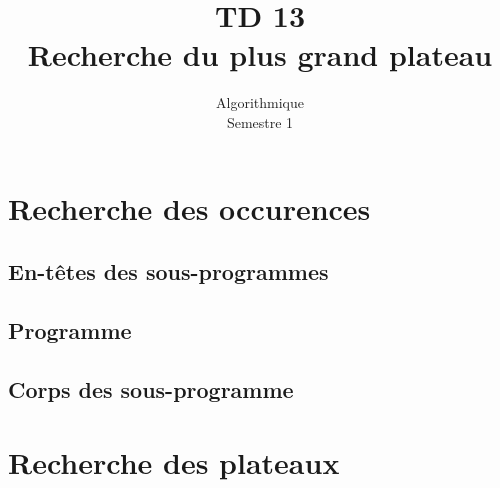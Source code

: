 \documentclass{article}
\title{TD 13\\ Recherche du plus grand plateau}
\date{Algorithmique\\ Semestre 1}
\begin{document}
	\maketitle
	\section{Recherche des occurences}
		\subsection{En-têtes des sous-programmes}
			\subsubsection{}
				
			\subsubsection{}
				
			\subsubsection{}
				
			\subsubsection{}
				
		\subsection{Programme}
				
		\subsection{Corps des sous-programme}
			\subsubsection{}
				
			\subsubsection{}
				
	\section{Recherche des plateaux}
\end{document}
